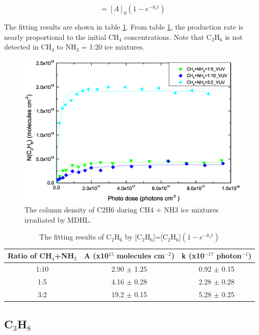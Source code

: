 \begin{equation}
[A] = [A]_0(1 - e^{-k_1 t})
\label{eq:1step}
\end{equation}

The fitting results are shown in table \ref{tab:fittingC2H6}. From table \ref{tab:fittingC2H6}, the production rate is nearly proportional to the initial CH$_4$ concentrations.  Note that C$_2$H$_6$ is not detected in CH$_4$ to NH$_3$ = 1:20 ice mixtures.

\begin{figure}
\centering
\includegraphics[width=\textwidth]{figures/chapter3/Lab_C2H6.eps}
\caption{The column density of C2H6 during CH4 + NH3 ice mixtures irradiated by MDHL. }
\label{fig:lab_C2H6}
\end{figure}

\begin{table}[htbp]
\caption{The fitting results of C$_2$H$_6$ by [C$_2$H$_6$]=[C$_2$H$_6$]$(1 - e^{-k_1 t})$}
\label{tab:fittingC2H6}
\begin{tabular}{ccc}
\hline
\hline
Ratio of CH$_4$+NH$_3$ & A (x10$^{15}$ molecules cm$^{-2}$) & k (x10$^{-17}$ photon$^{-1}$) \\
\hline
1:10 & 2.90 $\pm$ 1.25 & 0.92 $\pm$ 0.15 \\
1:5 & 4.16 $\pm$ 0.28 & 2.28 $\pm$ 0.28 \\
3:2 & 19.2 $\pm$ 0.15 & 5.28 $\pm$ 0.25 \\
\hline
\end{tabular}
\end{table}


\subsection{C$_3$H$_8$}

